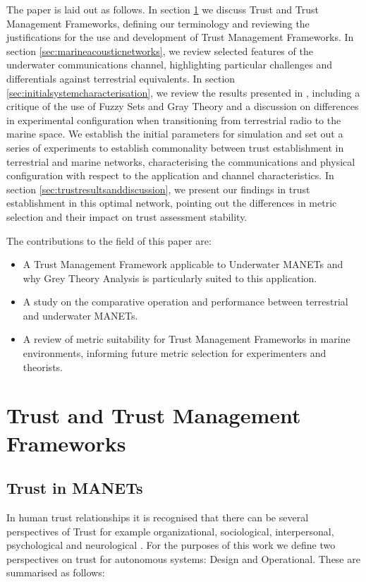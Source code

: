 \documentclass[runningheads,a4paper]{llncs}
\begin{document}
The paper is laid out as follows.
In section \ref{sec:trustandtmfs} we discuss Trust and Trust Management Frameworks, defining our terminology and reviewing the justifications for the use and development of Trust Management Frameworks.
In section \ref{sec:marineacousticnetworks}, we review selected features of the underwater communications channel, highlighting particular challenges and differentials against terrestrial equivalents.
In section \ref{sec:initialsystemcharacterisation}, we review the results presented in \cite{Guo11}, including a critique of the use of Fuzzy Sets and Gray Theory and a discussion on differences in experimental configuration when transitioning from terrestrial radio to the marine space. 
We establish the initial parameters for simulation and set out a series of experiments to establish commonality between trust establishment in terrestrial and marine networks, characterising the communications and physical configuration with respect to the application and channel characteristics.
In section \ref{sec:trustresultsanddiscussion}, we present our findings in trust establishment in this optimal network, pointing out the differences in metric selection and their impact on trust assessment stability.

The contributions to the field of this paper are:
\begin{itemize}
  \item A Trust Management Framework applicable to Underwater MANETs and why Grey Theory Analysis is particularly suited to this application.
  \item A study on the comparative operation and performance between terrestrial and underwater MANETs.
  \item A review of metric suitability for Trust Management Frameworks in marine environments, informing future metric selection for experimenters and theorists.
\end{itemize}

\section{Trust and Trust Management Frameworks}\label{sec:trustandtmfs}

\subsection{Trust in MANETs}\label{sec:trustinmanets}

In human trust relationships it is recognised that there can be several perspectives of Trust for example organizational, sociological, interpersonal, psychological and neurological \cite{Lee2004}.
For the purposes of this work we define two perspectives on trust for autonomous systems: Design and Operational. These are summarised as follows:
\end{document}
